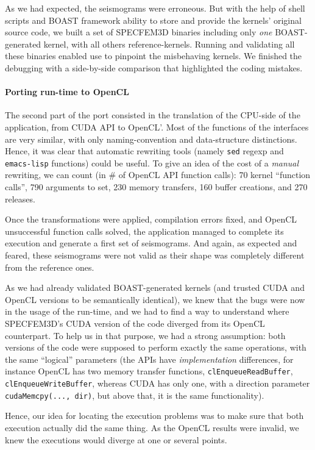 \documentclass{IEEEtran}
\newcommand{\code}[1]{\texttt{#1}}
\begin{document}
As we had expected, the seismograms were erroneous. But with the help
of shell scripts and BOAST framework ability to store and provide the
kernels' original source code, we built a set of SPECFEM3D binaries
including only \emph{one} BOAST-generated kernel, with all others
reference-kernels. Running and validating all these binaries enabled
use to pinpoint the misbehaving kernels. We finished the debugging
with a side-by-side comparison that highlighted the coding mistakes.

\paragraph{Porting run-time to OpenCL} The second part of the port
consisted in the translation of the CPU-side of the application, from
CUDA API to OpenCL'. Most of the functions of the interfaces are very
similar, with only naming-convention and data-structure
distinctions. Hence, it was clear that automatic rewriting tools
(namely \code{sed} regexp and \code{emacs-lisp} functions) could be
useful. To give an idea of the cost of a \emph{manual} rewriting, we
can count (in \# of OpenCL API function calls): 70 kernel ``function
calls'', 790 arguments to set, 230 memory transfers, 160 buffer
creations, and 270 releases.

Once the transformations were applied,
compilation errors fixed, and OpenCL unsuccessful function calls solved,
the application managed to complete its execution and generate a first
set of seismograms. And again, as expected and feared, these
seismograms were not valid as their shape was completely different from the
reference ones.

As we had already validated BOAST-generated kernels (and trusted CUDA and OpenCL
versions to be semantically identical), we knew that the bugs were now in the
usage of the run-time, and we had to find a way to understand where SPECFEM3D's
CUDA version of the code diverged from its OpenCL counterpart. To help us in
that purpose, we had a strong assumption: both versions of the code were
supposed to perform exactly the same operations, with the same ``logical''
parameters (the APIs have \emph{implementation} differences, for instance OpenCL
has two memory transfer functions, \code{clEnqueueReadBuffer},
\code{clEnqueueWriteBuffer}, whereas CUDA has only one, with a direction
parameter \code{cudaMemcpy(..., dir)}, but above that, it is the same
functionality).

Hence, our idea for locating the execution problems was to make sure
that both execution actually did the same thing. As the OpenCL results
were invalid, we knew the executions would diverge at one or several
points.
\end{document}
